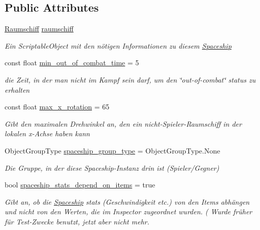 \subsection*{Public Attributes}
\begin{DoxyCompactItemize}
\item 
\hyperlink{class_raumschiff}{Raumschiff} \hyperlink{class_spaceship_a771d4dcd411d0d08d1c2a67fd6b5f5c1}{raumschiff}
\begin{DoxyCompactList}\small\item\em Ein Scriptable\+Object mit den nötigen Informationen zu diesem \hyperlink{class_spaceship}{Spaceship} \end{DoxyCompactList}\item 
const float \hyperlink{class_spaceship_a862815bd4b04d532e2894ced48d2acc6}{min\+\_\+out\+\_\+of\+\_\+combat\+\_\+time} = 5
\begin{DoxyCompactList}\small\item\em die Zeit, in der man nicht im Kampf sein darf, um den \char`\"{}out-\/of-\/combat\char`\"{} status zu erhalten \end{DoxyCompactList}\item 
const float \hyperlink{class_spaceship_a44d9e635e6d659a4de6808bb36770ea5}{max\+\_\+x\+\_\+rotation} = 65
\begin{DoxyCompactList}\small\item\em Gibt den maximalen Drehwinkel an, den ein nicht-\/\+Spieler-\/\+Raumschiff in der lokalen x-\/\+Achse haben kann \end{DoxyCompactList}\item 
Object\+Group\+Type \hyperlink{class_spaceship_a3b6cdeee7ecba55cf3807661e8662bea}{spaceship\+\_\+group\+\_\+type} = Object\+Group\+Type.\+None
\begin{DoxyCompactList}\small\item\em Die Gruppe, in der diese Spaceship-\/\+Instanz drin ist (Spieler/\+Gegner) \end{DoxyCompactList}\item 
bool \hyperlink{class_spaceship_acdd2d51050e8368133ae24362d7b2ddf}{spaceship\+\_\+stats\+\_\+depend\+\_\+on\+\_\+items} = true
\begin{DoxyCompactList}\small\item\em Gibt an, ob die \hyperlink{class_spaceship}{Spaceship} stats (Geschwindigkeit etc.) von den Items abhängen und nicht von den Werten, die im Inspector zugeordnet wurden. ( Wurde früher für Test-\/\+Zwecke benutzt, jetzt aber nicht mehr. \end{DoxyCompactList}\item 

\end{DoxyCompactItemize}
